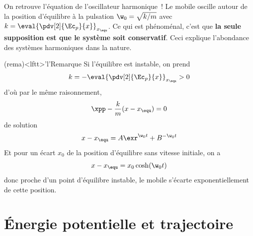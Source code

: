 \documentclass[../../main/main.tex]{subfiles}
\begin{document}
On retrouve l'équation de l'oscillateur harmonique~! Le mobile oscille autour de
la position d'équilibre à la pulsation $\w_0 = \sqrt{k/m}$ avec $k =
	\eval{\pdv[2]{\Ec_p}{x}}_{x_{\equ}}$. Ce qui est phénoménal, c'est que \textbf{la
	seule supposition est que le système soit conservatif}. Ceci explique
l'abondance des systèmes harmoniques dans la nature.

\begin{tcb*}(rema)<lftt>'l'{Remarque}
	Si l'équilibre est instable, on prend
	\[k = - \eval{\pdv[2]{\Ec_p}{x}}_{x_{\equ}} > 0\]
	d'où par le même raisonnement,
	\[\xpp - \frac{k}{m}(x-x_{\equ}) = 0\]
	de solution
	\[x-x_{\equ} = A\exr^{\w_0t} + B^{-\w_0t}\]
	Et pour un écart $x_0$ de la position d'équilibre sans vitesse initiale, on
	a
	\[x - x_{\equ} = x_0\cosh(\w_0t)\]
	donc proche d'un point d'équilibre instable, le mobile s'écarte
	exponentiellement de cette position.
\end{tcb*}

\section{Énergie potentielle et trajectoire}
\end{document}
